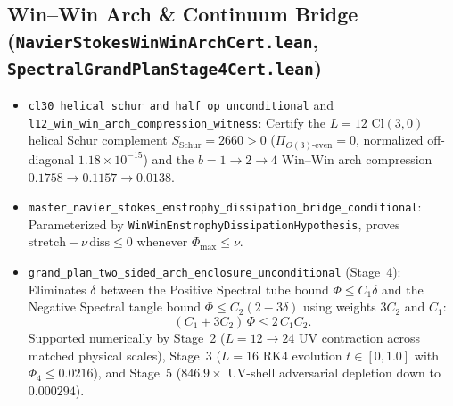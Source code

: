 \documentclass[11pt,a4paper]{article}
\begin{document}
\subsection{Win--Win Arch \& Continuum Bridge (\texttt{NavierStokesWinWinArchCert.lean}, \texttt{SpectralGrandPlanStage4Cert.lean})}
\begin{itemize}
  \item \texttt{cl30\_helical\_schur\_and\_half\_op\_unconditional} and \texttt{l12\_win\_win\_arch\_compression\_witness}: Certify the $L=12$ $\mathrm{Cl}(3,0)$ helical Schur complement $S_{\mathrm{Schur}} = 2660 > 0$ ($\Pi_{O(3)\text{-even}} = 0$, normalized off-diagonal $1.18\times 10^{-15}$) and the $b=1\to 2\to 4$ Win--Win arch compression $0.1758 \to 0.1157 \to 0.0138$.
  \item \texttt{master\_navier\_stokes\_enstrophy\_dissipation\_bridge\_conditional}: Parameterized by \texttt{WinWinEnstrophyDissipationHypothesis}, proves $\mathrm{stretch} - \nu\,\mathrm{diss} \le 0$ whenever $\Phi_{\max} \le \nu$.
  \item \texttt{grand\_plan\_two\_sided\_arch\_enclosure\_unconditional} (Stage~4): Eliminates $\delta$ between the Positive Spectral tube bound $\Phi \le C_1 \delta$ and the Negative Spectral tangle bound $\Phi \le C_2 (2 - 3\delta)$ using weights $3 C_2$ and $C_1$:
  \[
    (C_1 + 3 C_2)\,\Phi \le 2\,C_1 C_2.
  \]
  Supported numerically by Stage~2 ($L=12 \to 24$ UV contraction across matched physical scales), Stage~3 ($L=16$ RK4 evolution $t\in[0,1.0]$ with $\Phi_4 \le 0.0216$), and Stage~5 ($846.9\times$ UV-shell adversarial depletion down to $0.000294$).
\end{itemize}
\end{document}
